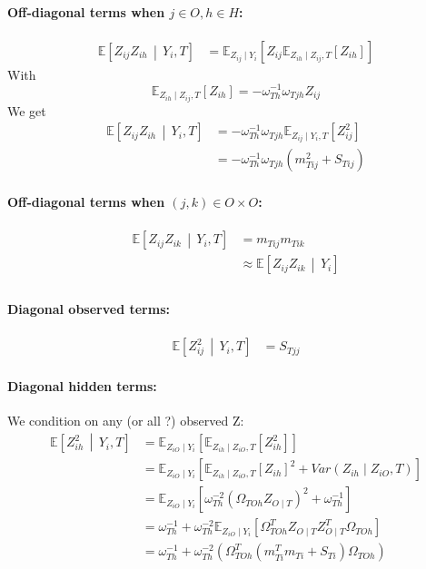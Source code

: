\documentclass[11pt,a4paper]{article}
\newcommand{\Esp}{\mathds{E}}
\begin{document}
\paragraph{Off-diagonal terms when $j\in O, h\in H$:}
\begin{align*}
\Esp\left[ Z_{ij} Z_{ih} \,\middle\vert\,  Y_i,T \right] &=\Esp_{Z_{ij}\mid Y_i}\left[Z_{ij} \Esp_{Z_{ih}\mid  Z_{ij},T}[Z_{ih}]\right]
\end{align*}
With $$\Esp_{Z_{ih}\mid Z_{ij},T}[Z_{ih}] = -\omega_{Th}^{-1}\omega_{Tjh} Z_{ij}$$
We get
\begin{align*}
\Esp\left[ Z_{ij} Z_{ih} \,\middle\vert\,  Y_i,T \right] &= -\omega_{Th}^{-1}\omega_{Tjh} \Esp_{Z_{ij}\mid Y_i, T}\left[Z_{ij}^2  \right]\\
&=- \omega_{Th}^{-1}\omega_{Tjh} (m_{Tij}^2 + S_{Tij})
\end{align*}

\paragraph{Off-diagonal terms  when $(j,k)\in O\times O$:}
\begin{align*}
\Esp\left[ Z_{ij} Z_{ik} \,\middle\vert\,  Y_i,T \right] &=  m_{Tij}m_{Tik}\\
& \approx\Esp\left[Z_{ij} Z_{ik}  \,\middle\vert\,  Y_i\right]\\
\end{align*}
\paragraph{Diagonal observed terms:}
\begin{align*}
\Esp\left[ Z_{ij}^2 \,\middle\vert\,  Y_i,T \right] &= S_{Tjj}
\end{align*}
\paragraph{Diagonal hidden terms:\\}
We condition on any (or all ?) observed Z:
 \begin{align*}
\Esp\left[ Z_{ih}^2 \,\middle\vert\,  Y_i,T \right] & = \Esp_{Z_{iO}\mid Y_i}\left[ \Esp_{Z_{ih}\mid  Z_{iO},T}[Z_{ih}^2]\right]\\
&= \Esp_{Z_{iO}\mid Y_i}\left[ \Esp_{Z_{ih}\mid  Z_{iO},T}[Z_{ih}]^2 + Var(Z_{ih} \mid Z_{iO}, T)\right]\\
&= \Esp_{Z_{iO}\mid Y_i}\left[ \omega_{Th}^{-2}(\Omega_{TOh}Z_{O\mid T})^2 + \omega_{Th}^{-1}\right]\\
&= \omega_{Th}^{-1}+\omega_{Th}^{-2}\Esp_{Z_{iO}\mid Y_i}\left[ \Omega_{TOh}^TZ_{O\mid T}Z_{O\mid T}^T\Omega_{TOh} \right]\\
&= \omega_{Th}^{-1}+\omega_{Th}^{-2}\left(\Omega_{TOh}^T(m_{Ti}^Tm_{Ti}+S_{Ti})\Omega_{TOh}\right)
\end{align*}
\end{document}
